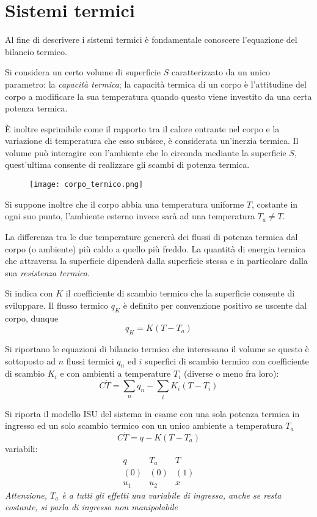 
\section{Sistemi termici}
Al fine di descrivere i sistemi termici è fondamentale conoscere l'equazione
del bilancio termico.

Si considera un certo volume di superficie $S$ caratterizzato da un unico
parametro: la \textit{capacità termica}; la capacità termica di un corpo è
l'attitudine del corpo a modificare la sua temperatura quando questo viene
investito da una certa potenza termica.

È inoltre esprimibile come il rapporto tra il calore entrante nel corpo e la
variazione di temperatura che esso subisce, è considerata un'inerzia termica.
Il volume può interagire con l'ambiente che lo circonda mediante la superficie
$S$, quest'ultima consente di realizzare gli scambi di potenza termica.
\begin{figure}
 \centering
 \texttt{[image: corpo\_termico.png]}
 \label{Fig.:corpo_termico}
\end{figure}

Si suppone inoltre che il corpo abbia una temperatura uniforme $T$, costante in
ogni suo punto, l'ambiente esterno invece sarà ad una temperatura $T_a\neq T$.

La differenza tra le due temperature genererà dei flussi di potenza termica dal
corpo (o ambiente) più caldo a quello più freddo.
La quantità di energia termica che attraversa la superficie dipenderà dalla
superficie stessa e in particolare dalla sua \textit{resistenza termica}.

Si indica con $K$ il coefficiente di scambio termico che la superficie consente
di sviluppare.
Il flusso termico $q_K$ è definito per convenzione positivo se uscente dal
corpo, dunque
$$
q_K = K(T-T_a)
$$

Si riportano le equazioni di bilancio termico che interessano il volume se
questo è sottoposto ad $n$ flussi termici $q_n$ ed $i$ superfici di scambio
termico con coefficiente di scambio $K_i$ e con ambienti a temperature $T_i$
(diverse o meno fra loro):
$$
C\dot{T} = \sum_n q_n -\sum_i K_i(T-T_i)
$$

Si riporta il modello ISU del sistema in esame con una sola potenza termica in
ingresso ed un solo scambio termico con un unico ambiente
 a temperatura $T_a$
$$
C\dot{T} = q -K(T-T_a)
$$
variabili:
$$\begin{matrix}
q & T_a & T \\
(0) & (0) & (1) \\
u_1 & u_2 & x
\end{matrix}
$$
\emph{Attenzione, $T_a$ è a tutti gli effetti una variabile di ingresso, anche
se resta costante, si parla di ingresso non manipolabile}

